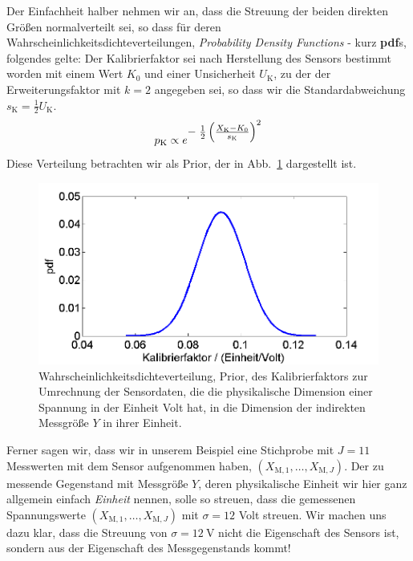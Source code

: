 Der Einfachheit halber nehmen wir an, dass die Streuung der beiden direkten Größen
normalverteilt sei, so dass für deren Wahrscheinlichkeitsdichteverteilungen,
\textsl{Probability Density Functions} - kurz \textbf{pdf}s, folgendes gelte:
Der Kalibrierfaktor sei nach Herstellung des Sensors bestimmt worden mit einem Wert
$K_0$ und einer Unsicherheit $U_\mathrm{K}$, zu der der Erweiterungsfaktor mit $k = 2$
angegeben sei, so dass wir die Standardabweichung $s_\mathrm{K} = \frac{1}{2} U_\mathrm{K}$.
\begin{equation}
p_\mathrm{K} \propto
 e^{\textstyle -\;\frac{1}{2} \left(\frac{ X_\mathrm{K} - K_0}{s_\mathrm{K}} \right)^2}
\label{PriorKalibrierfaktor}
\end{equation}
Diese Verteilung betrachten wir als Prior, der in Abb.~\ref{fig:Kalibrierfaktor} dargestellt ist.
\begin{figure}[!htp]
	\begin{center}
		\includegraphics[width=140mm]{11_vorlesung_GUMS1/media/Kalibrierfaktor.png}
		\caption{Wahrscheinlichkeitsdichteverteilung, Prior, des
		Kalibrierfaktors zur Umrechnung der Sensordaten, die die physikalische
		Dimension einer Spannung in der Einheit Volt hat, in die Dimension der
		indirekten Messgröße $Y$ in ihrer Einheit.}
		\label{fig:Kalibrierfaktor}
	\end{center}
\end{figure}
Ferner sagen wir, dass wir in unserem Beispiel eine Stichprobe mit $J = 11$ Messwerten
mit dem Sensor aufgenommen haben, $(X_{\mathrm{M},1}, \dots, X_{\mathrm{M},J})$.
Der zu messende Gegenstand mit Messgröße $Y$, deren physikalische Einheit wir hier
ganz allgemein einfach \textsl{Einheit} nennen, solle so streuen, dass die gemessenen
Spannungswerte $(X_{\mathrm{M},1}, \dots, X_{\mathrm{M},J})$ mit $\sigma = 12$ Volt streuen.
Wir machen uns dazu klar, dass die Streuung von $\sigma = 12~\mathrm{V}$ nicht die Eigenschaft
des Sensors ist, sondern aus der Eigenschaft des Messgegenstands kommt!

